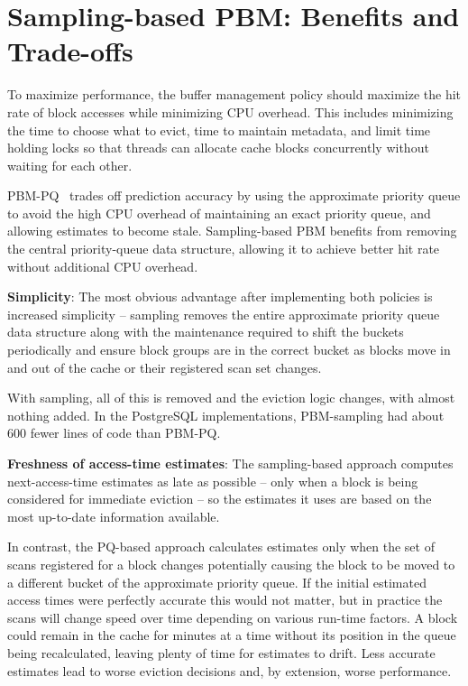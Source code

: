 \section{Sampling-based PBM: Benefits and Trade-offs\label{sec:sampling-advantages}}

To maximize performance, the buffer management policy should maximize the hit rate of block accesses while minimizing CPU overhead. This includes minimizing the time to choose what to evict, time to maintain metadata, and limit time holding locks so that threads can allocate cache blocks concurrently without waiting for each other.

PBM-PQ~\cite{pbm} trades off prediction accuracy by using the approximate priority queue to avoid the high CPU overhead of maintaining an exact priority queue, and allowing estimates to become stale. Sampling-based PBM benefits from removing the central priority-queue data structure, allowing it to achieve better hit rate without additional CPU overhead.


\textbf{Simplicity}: The most obvious advantage after implementing both policies is increased simplicity -- sampling removes the entire approximate priority queue data structure along with the maintenance required to shift the buckets periodically and ensure block groups are in the correct bucket as blocks move in and out of the cache or their registered scan set changes.

With sampling, all of this is removed and the eviction logic changes, with almost nothing added. In the PostgreSQL implementations, PBM-sampling had about 600 fewer lines of code than PBM-PQ.


\textbf{Freshness of access-time estimates}: The sampling-based approach computes next-access-time estimates as late as possible -- only when a block is being considered for immediate eviction -- so the estimates it uses are based on the most up-to-date information available.

In contrast, the PQ-based approach calculates estimates only when the set of scans registered for a block changes potentially causing the block to be moved to a different bucket of the approximate priority queue. If the initial estimated access times were perfectly accurate this would not matter, but in practice the scans will change speed over time depending on various run-time factors. A block could remain in the cache for minutes at a time without its position in the queue being recalculated, leaving plenty of time for estimates to drift. Less accurate estimates lead to worse eviction decisions and, by extension, worse performance.

